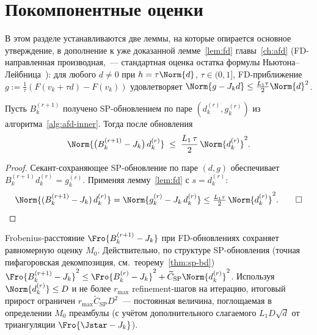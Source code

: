 \section{Покомпонентные оценки}
\label{sec:app-afd:components}

В этом разделе устанавливаются две леммы, на которые опирается основное
утверждение, в дополнение к уже доказанной лемме~\ref{lem:fd}
главы~\ref{ch:afd} (FD-направленная производная,~---
стандартная оценка остатка формулы Ньютона--Лейбница~\cite[Lemma~4.1.12]{dennis1996}):
для любого $d \ne 0$ при $h = \tau \Norm{d}$, $\tau \in (0, 1]$, FD-приближение
$g := \tfrac{1}{\tau}(F(v_k + \tau d) - F(v_k))$ удовлетворяет
$\Norm{g - J_k d} \le \tfrac{L_1 \tau}{2}\Norm{d}^2$.

\begin{lemma}
\label{lem:app-afd:dirbound}
Пусть $B_k^{(r+1)}$ получено SP-обновлением по паре $(d^{(r)}_k, g^{(r)}_k)$ из
алгоритма~\ref{alg:afd-inner}. Тогда после обновления
\begin{equation}
\Norm{\bigl(B_k^{(r+1)} - J_k\bigr)\, d^{(r)}_k}
\;\le\;
\frac{L_1\, \tau}{2}\,\Norm{d^{(r)}_k}^{2}.
\label{eq:app-afd:dirbound}
\end{equation}
\end{lemma}

\begin{proof}
Секант-сохраняющее SP-обновление по паре $(d, g)$ обеспечивает
$B_k^{(r+1)} d^{(r)}_k = g^{(r)}_k$. Применяя лемму~\ref{lem:fd}
с $s = d^{(r)}_k$:
\[
\Norm{(B_k^{(r+1)} - J_k)\, d^{(r)}_k}
= \Norm{g^{(r)}_k - J_k\, d^{(r)}_k}
\le \tfrac{L_1 \tau}{2}\,\Norm{d^{(r)}_k}^{2}. \qed
\]
\end{proof}

\begin{remark}
\label{rem:app-afd:M0-preserved}
Frobenius-расстояние $\Fro{B_k^{(r+1)} - J_k}$ при FD-обновлениях
сохраняет равномерную оценку $M_0$. Действительно, по структуре
SP-обновления (точная пифагоровская декомпозиция, см.\ теорему~\ref{thm:sp-bd})
$\Fro{B_k^{(r+1)} - J_k}^{2} \le \Fro{B_k^{(r)} - J_k}^{2} +
\widetilde C_{\mathrm{SP}}\Norm{d^{(r)}_k}^{2}$. Используя $\Norm{d^{(r)}_k}\le D$
и не более $r_{\max}$ refinement-шагов на итерацию, итоговый прирост
ограничен $r_{\max}\widetilde C_{\mathrm{SP}}D^{2}$~--- постоянная величина,
поглощаемая в определении $M_0$ преамбулы (с учётом дополнительного
слагаемого $L_1 D \sqrt{d}$ от триангуляции $\Fro{\Jstar - J_k}$).
\end{remark}

